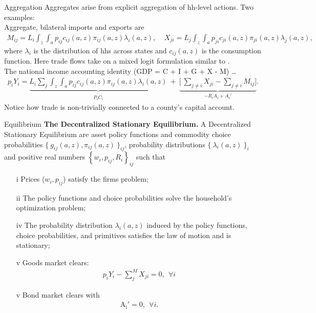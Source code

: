 \documentclass[9pt,pdftex,aspectratio=1610]{beamer}
\theoremstyle{definition}
\begin{document}
\begin{frame}[t]{Aggregation}
\smallskip
Aggregates arise from explicit aggregation of hh-level actions. Two examples:\\
\medskip
\medskip
Aggregate, bilateral imports and exports are
\begin{align*}
M_{ij} = L_i \int_{z} \int_{a}  p_{ij} c_{ij}(a, z) \pi_{ij}(a, z) \lambda_i(a, z), \ \ \ \ \ X_{ji} = L_j \int_{z} \int_{a}  p_{ji} c_{ji}(a, z) \pi_{ji}(a, z) \lambda_j(a, z),
\end{align*}
where $\lambda_i$ is the distribution of hhs across states and $c_{ij}(a, z)$ is the consumption function. Here trade flows take on a mixed logit formulation similar to \citet*{berry1995automobile}. \\
\bigskip
\medskip
The national income accounting identity (GDP = C + I + G + X - M) \ldots
\begin{align*}
p_{i} Y_{i}  =  \underbrace{L_{i} \sum_{j} \int_{z} \int_{a}  p_{ij} c_{ij}(a, z) \pi_{ij}(a, z) \lambda_i(a, z)}_{\widetilde{P_{i} C_i}} \ + \ \underbrace{\bigg[\ \sum_{j\neq i}X_{ji} -  \sum_{j\neq i}M_{ij} \bigg]}_{-R_{i}A_i + A_{i}'}.
\end{align*}
Notice how trade is non-trivially connected to a county's capital account.
\end{frame}

\begin{frame}[t]{Equilibrium}
\smallskip
\textbf{The Decentralized Stationary Equilibrium.} A Decentralized Stationary Equilibrium are asset policy functions and commodity choice probabilities $\{\  g_{ij}(a, z), \pi_{ij}(a, z) \ \}_{ij}$, probability distributions $\{ \ \lambda_i(a, z) \ \}_{i}$ and positive real numbers $\left \{w_i, p_{ij}, R_i\right \}_{ij}$ such that
\begin{itemize}
\smallskip
\item[i]  Prices ($w_i, p_{ij}$) satisfy the firms problem;
\item[ii] The policy functions and choice probabilities solve the household's optimization problem;
\item[iv] The probability distribution $\lambda_i(a, z)$ induced by the policy functions, choice probabilities, and primitives satisfies the law of motion and is stationary;
\item[v] Goods market clears:
\begin{align*}
p_{i} Y_{i} - \sum_{j}^{M}  X_{ji} = 0, \ \ \forall i
\end{align*}
\item[v] Bond market clears with
\begin{align*}
\mathrm{A_i'} = 0, \ \ \forall i.
\end{align*}
\end{itemize}
\end{frame}
\end{document}
